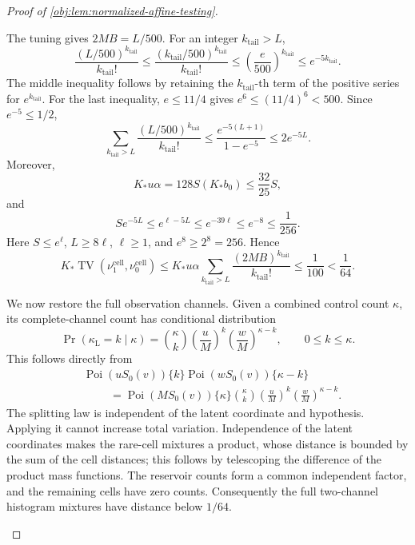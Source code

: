 \begin{proof}[Proof of \cref{obj:lem:normalized-affine-testing}]
\begin{enumerate}
The tuning gives \(2MB=L/500\). For an integer \(k_{\mathrm{tail}}>L\),
\[
\frac{(L/500)^{k_{\mathrm{tail}}}}{k_{\mathrm{tail}}!}
\le\frac{(k_{\mathrm{tail}}/500)^{k_{\mathrm{tail}}}}{k_{\mathrm{tail}}!}
\le\left(\frac{e}{500}\right)^{k_{\mathrm{tail}}}
\le e^{-5k_{\mathrm{tail}}}.
\]
The middle inequality follows by retaining the \(k_{\mathrm{tail}}\)-th term of the positive series for \(e^{k_{\mathrm{tail}}}\). For the last inequality, \(e\le11/4\) gives
\(e^6\le(11/4)^6<500\). Since \(e^{-5}\le1/2\),
\[
\sum_{k_{\mathrm{tail}}>L}\frac{(L/500)^{k_{\mathrm{tail}}}}{k_{\mathrm{tail}}!}
\le\frac{e^{-5(L+1)}}{1-e^{-5}}
\le2e^{-5L}.
\]
Moreover,
\[
K_*u\alpha=128S(K_*b_0)\le\frac{32}{25}S,
\]
and
\[
Se^{-5L}
\le e^{\ell-5L}
\le e^{-39\ell}
\le e^{-8}\le\frac1{256}.
\]
Here \(S\le e^\ell\), \(L\ge8\ell\), \(\ell\ge1\), and
\(e^8\ge2^8=256\). Hence
\[
K_*\operatorname{TV}(\nu_1^{\mathrm{cell}},\nu_0^{\mathrm{cell}})
\le K_*u\alpha\sum_{k_{\mathrm{tail}}>L}\frac{(2MB)^{k_{\mathrm{tail}}}}{k_{\mathrm{tail}}!}
\le\frac1{100}<\frac1{64}.
\]

We now restore the full observation channels. Given a combined control count \(\kappa\), its complete-channel count has conditional distribution
\[
\Pr(\kappa_{\mathrm L}=k\mid\kappa)
=\binom{\kappa}{k}\left(\frac uM\right)^k
                    \left(\frac wM\right)^{\kappa-k},
\qquad 0\le k\le\kappa.
\]
This follows directly from
\[
\begin{aligned}
&\operatorname{Poi}(uS_0(v))\{k\}
 \operatorname{Poi}(wS_0(v))\{\kappa-k\}\\
&\hspace{1cm}=
\operatorname{Poi}(MS_0(v))\{\kappa\}
\binom{\kappa}{k}\left(\frac uM\right)^k
                    \left(\frac wM\right)^{\kappa-k}.
\end{aligned}
\]
The splitting law is independent of the latent coordinate and hypothesis. Applying it cannot increase total variation. Independence of the latent coordinates makes the rare-cell mixtures a product, whose distance is bounded by the sum of the cell distances; this follows by telescoping the difference of the product mass functions. The reservoir counts form a common independent factor, and the remaining cells have zero counts. Consequently the full two-channel histogram mixtures have distance below \(1/64\).


\end{enumerate}
\end{proof}
